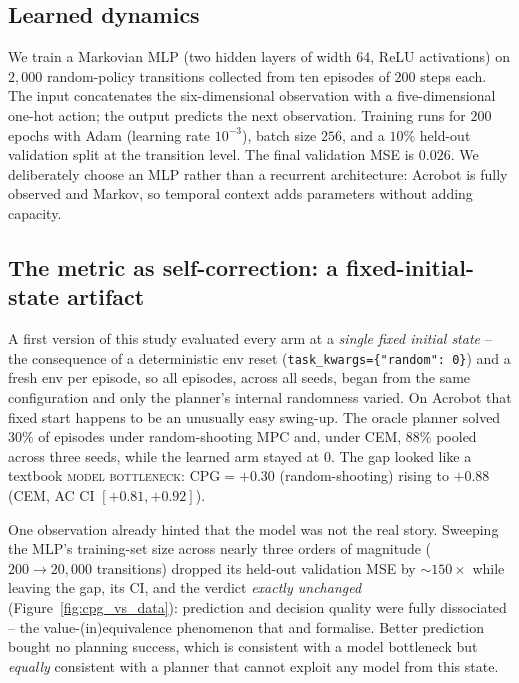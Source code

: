 \documentclass[10pt,letterpaper]{article}
\begin{document}
\subsection{Learned dynamics}

We train a Markovian MLP (two hidden layers of width $64$, ReLU activations) on $2{,}000$ random-policy transitions collected from ten episodes of $200$ steps each. The input concatenates the six-dimensional observation with a five-dimensional one-hot action; the output predicts the next observation. Training runs for $200$ epochs with Adam (learning rate $10^{-3}$), batch size $256$, and a $10\%$ held-out validation split at the transition level. The final validation MSE is $0.026$. We deliberately choose an MLP rather than a recurrent architecture: Acrobot is fully observed and Markov, so temporal context adds parameters without adding capacity.

\subsection{The metric as self-correction: a fixed-initial-state artifact}
\label{sec:selfcorrection}

A first version of this study evaluated every arm at a \emph{single fixed initial state} -- the consequence of a deterministic env reset (\texttt{task\_kwargs=\{"random": 0\}}) and a fresh env per episode, so all episodes, across all seeds, began from the same configuration and only the planner's internal randomness varied. On Acrobot that fixed start happens to be an unusually easy swing-up. The oracle planner solved $30\%$ of episodes under random-shooting MPC and, under CEM, $88\%$ pooled across three seeds, while the learned arm stayed at $0$. The gap looked like a textbook \textsc{model bottleneck}: $\mathrm{CPG} = +0.30$ (random-shooting) rising to $+0.88$ (CEM, AC CI $[+0.81, +0.92]$).

One observation already hinted that the model was not the real story. Sweeping the MLP's training-set size across nearly three orders of magnitude ($200 \to 20{,}000$ transitions) dropped its held-out validation MSE by $\sim\!150\times$ while leaving the gap, its CI, and the verdict \emph{exactly unchanged} (Figure~\ref{fig:cpg_vs_data}): prediction and decision quality were fully dissociated -- the value-(in)equivalence phenomenon that \citet{grimm2020value} and \citet{farahmand2017value} formalise. Better prediction bought no planning success, which is consistent with a model bottleneck but \emph{equally} consistent with a planner that cannot exploit any model from this state.
\end{document}
